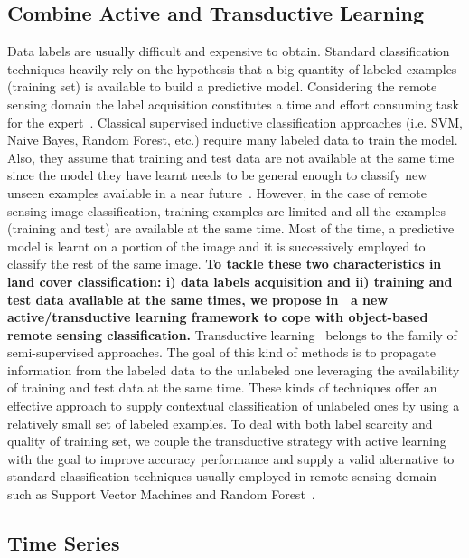 \subsection{Combine Active and Transductive Learning}
Data labels are usually difficult and expensive to obtain. Standard classification techniques heavily rely on the hypothesis that a big quantity of labeled examples (training set) is available to build a predictive model. Considering the remote sensing domain the label acquisition constitutes a time and effort consuming task for the expert~\cite{DemirMB14}. 
Classical supervised inductive classification approaches (i.e. SVM, Naive Bayes, Random Forest, etc.) require many labeled data to train the model. Also, they assume that training and test data are not available at the same time since the model they have learnt needs to be general enough  to classify new unseen examples available in a near future~\cite{0097035}. However, in the case of remote sensing image classification, training examples are limited and all the examples (training and test) are available at the same time. Most of the time, a predictive model is learnt on a portion of the image and it is successively employed to classify the rest of the same image.
\textbf{To tackle these two characteristics in land cover classification: i) data labels acquisition and ii) training and test data available at the same times, we propose in~\cite{Guttler16} a new active/transductive learning framework to cope with object-based remote sensing classification.}
Transductive learning~\cite{SousaRB13} belongs to the family of semi-supervised approaches. The goal of this kind of methods is to propagate information from the labeled data to the unlabeled one leveraging the availability of training and test data at the same time. These kinds of techniques offer an effective approach to supply contextual classification of unlabeled ones by using a relatively small set of labeled examples.
To deal with both label scarcity and quality of training set, we couple the transductive strategy with active learning with the goal to improve accuracy performance and supply a valid alternative to standard classification techniques usually employed in remote sensing domain such as Support Vector Machines and Random Forest~\cite{HuangZ13}.

\subsection{Time Series}

